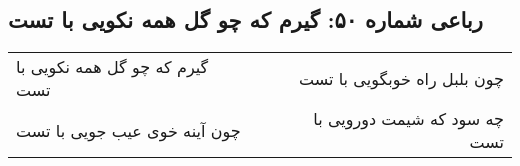\begin{center}
\section*{رباعی شماره ۵۰: گیرم که چو گل همه نکویی با تست}
\label{sec:sh050}
\begin{longtable}{l p{0.5cm} r}
گیرم که چو گل همه نکویی با تست
&&
چون بلبل راه خوبگویی با تست
\\
چون آینه خوی عیب جویی با تست
&&
چه سود که شیمت دورویی با تست
\\
\end{longtable}
\end{center}
